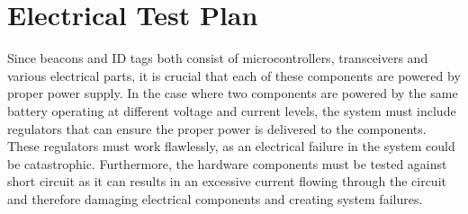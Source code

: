 

\setcounter{section}{3}
%
\section{Electrical Test Plan}
\bigskip


Since beacons and ID tags both consist of microcontrollers, transceivers and various electrical parts, it is crucial that each of these components are powered by proper power supply. In the case where two components are powered by the same battery operating at different voltage and current levels, the system must include regulators that can ensure the proper power is delivered to the components. These regulators must work flawlessly, as an electrical failure in the system could be catastrophic. Furthermore, the hardware components must be tested against short circuit as it can results in an excessive current flowing through the circuit and therefore damaging electrical components and creating system failures.



